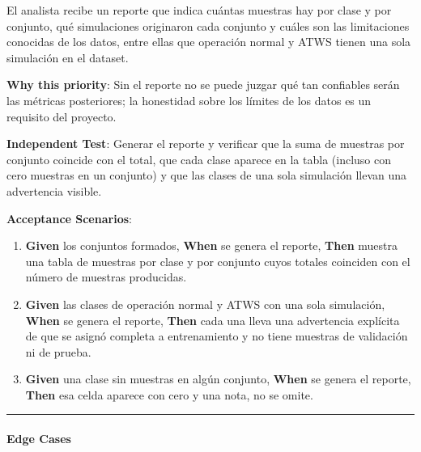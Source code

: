 \documentclass[12pt,a4paper]{article}
\providecommand{\tightlist}{\setlength{\itemsep}{0pt}\setlength{\parskip}{0pt}}
\newenvironment{documentogenerado}[2]{%
  \def\doccomando{#1}\def\docruta{#2}%
  \par\begingroup\small\setstretch{1.15}\sloppy%
}{\endgroup\par\medskip}
\begin{document}
\begin{documentogenerado}{/speckit-specify + /speckit-clarify}{specs\slash 001-preparacion-datos\slash spec.md}
El analista recibe un reporte que indica cuántas muestras hay por clase y por conjunto, qué simulaciones originaron cada conjunto y cuáles son las limitaciones conocidas de los datos, entre ellas que operación normal y ATWS tienen una sola simulación en el dataset.

\textbf{Why this priority}: Sin el reporte no se puede juzgar qué tan confiables serán las métricas posteriores; la honestidad sobre los límites de los datos es un requisito del proyecto.

\textbf{Independent Test}: Generar el reporte y verificar que la suma de muestras por conjunto coincide con el total, que cada clase aparece en la tabla (incluso con cero muestras en un conjunto) y que las clases de una sola simulación llevan una advertencia visible.

\textbf{Acceptance Scenarios}:

\begin{enumerate}
\def\labelenumi{\arabic{enumi}.}
\tightlist
\item
  \textbf{Given} los conjuntos formados, \textbf{When} se genera el reporte, \textbf{Then} muestra una tabla de muestras por clase y por conjunto cuyos totales coinciden con el número de muestras producidas.
\item
  \textbf{Given} las clases de operación normal y ATWS con una sola simulación, \textbf{When} se genera el reporte, \textbf{Then} cada una lleva una advertencia explícita de que se asignó completa a entrenamiento y no tiene muestras de validación ni de prueba.
\item
  \textbf{Given} una clase sin muestras en algún conjunto, \textbf{When} se genera el reporte, \textbf{Then} esa celda aparece con cero y una nota, no se omite.
\end{enumerate}

\begin{center}\rule{0.5\linewidth}{0.5pt}\end{center}

\paragraph{Edge Cases}


\end{documentogenerado}
\end{document}

